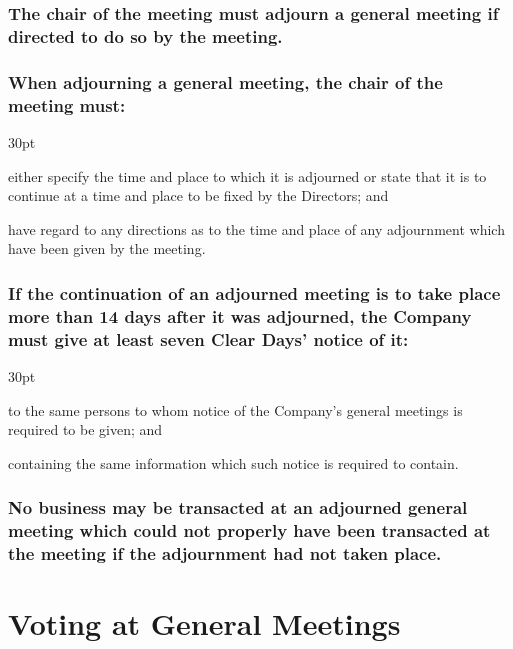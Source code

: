 \documentclass[12pt]{article}
\def\clauseindent{30pt}
\newenvironment{subindentpara}{\raggedright\begin{adjustwidth}{\clauseindent}{}\begin{hanginglist}}{\end{hanginglist}\end{adjustwidth}}
\begin{document}
\subsubsection[Adjournment may be directed at a general meeting]{The chair of the meeting must adjourn a general meeting if directed to do so by the meeting.}
\subsubsection[Specifics of adjournment of a general meeting]{When adjourning a general meeting, the chair of the meeting must:}
\begin{subindentpara}
    \item either specify the time and place to which it is adjourned or state that it is to continue at a time and place to be fixed by the Directors; and
    \item have regard to any directions as to the time and place of any adjournment which have been given by the meeting.
\end{subindentpara}
\subsubsection[Notice and adjournment]{If the continuation of an adjourned meeting is to take place more than 14 days after it was adjourned, the Company must give at least seven Clear Days' notice of it:}
\begin{subindentpara}
    \item to the same persons to whom notice of the Company's general meetings is required to be given; and
    \item containing the same information which such notice is required to contain.
\end{subindentpara}
\subsubsection[Adjourned meetings work like non-adjourned meetings]{No business may be transacted at an adjourned general meeting which could not properly have been transacted at the meeting if the adjournment had not taken place.}

\vspace{1.5\baselineskip}\section*{Voting at General Meetings}
\end{document}
